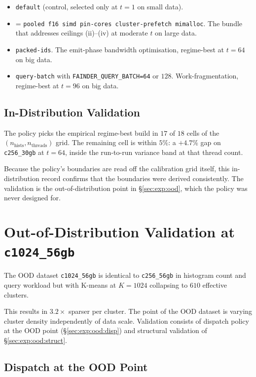 \begin{itemize}
  \item \texttt{default} (control, selected only at $t=1$ on small data).
  \item \bcombo{} = \texttt{pooled f16 simd pin-cores cluster-prefetch mimalloc}. The bundle that addresses ceilings (ii)--(iv) at moderate $t$ on large data.
  \item \texttt{packed-ids}. The emit-phase bandwidth optimisation, regime-best at $t{=}64$ on big data.
  \item \texttt{query-batch} with \texttt{FAINDER\_QUERY\_BATCH=64} or $128$. Work-fragmentation, regime-best at $t{=}96$ on big data.
\end{itemize}

\subsection{In-Distribution Validation}

The policy picks the empirical regime-best build in $17$ of $18$ cells of the $(n_\text{hists}, n_\text{threads})$ grid. The remaining cell is within $5\%$: a $+4.7\%$ gap on \texttt{c256\_30gb} at $t{=}64$, inside the run-to-run variance band at that thread count.

Because the policy's boundaries are read off the calibration grid itself, this in-distribution record confirms that the boundaries were derived consistently. The validation is the out-of-distribution point in §\ref{sec:exp:ood}, which the policy was never designed for.

\section{Out-of-Distribution Validation at \texttt{c1024\_56gb}\label{sec:exp:ood}}

The OOD dataset \texttt{c1024\_56gb} is identical to \texttt{c256\_56gb} in histogram count and query workload but with K-means at $K{=}1024$ collapsing to $610$ effective clusters.

This results in $3.2\times$ sparser per cluster. The point of the OOD dataset is varying cluster density independently of data scale. Validation consists of dispatch policy at the OOD point (§\ref{sec:exp:ood:disp}) and structural validation of §\ref{sec:exp:ood:struct}.

\subsection{Dispatch at the OOD Point\label{sec:exp:ood:disp}}

